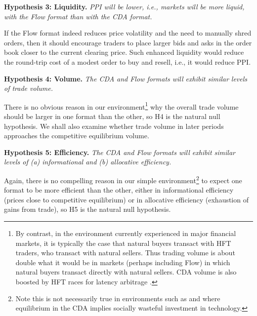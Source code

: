 \documentclass[12pt]{article}
\begin{document}
\vspace{0.3cm}
\noindent \textbf{Hypothesis 3: Liquidity.} \textit{ PPI will be lower, i.e., markets will be more liquid, with the Flow format than with the CDA format.}

\noindent 
If the Flow format indeed reduces price volatility and the need to manually shred orders, then it should encourage traders to place larger bids and asks in the order book closer to the current clearing price. Such enhanced liquidity would reduce the round-trip cost of a modest order to buy and resell, i.e., it would reduce PPI. 

\vspace{0.3cm}
\noindent \textbf{Hypothesis 4: Volume.} \textit{The CDA and Flow formats will exhibit similar levels of trade volume. }

\noindent There is no obvious reason in our environment\footnote{
{By contrast}, in the environment currently experienced in major financial markets, it is typically the case that natural buyers transact with HFT traders, who transact with natural sellers. Thus trading volume is about double what it would be in markets 
(perhaps including Flow) in which natural buyers transact directly with natural sellers.
CDA volume is also boosted by HFT races for latency arbitrage \citep{AquilinaBudishOneill2022}.}
why the overall trade volume should be larger in one format than the other, so H4 is the natural null hypothesis. We shall also examine whether trade volume in later periods approaches the competitive equilibrium volume. 

\vspace{0.3cm}
\noindent \textbf{Hypothesis 5: Efficiency.} \textit{The CDA and Flow formats will exhibit similar levels of (a) informational and (b) allocative efficiency.} 

\noindent Again, there is no compelling reason in our simple environment\footnote{
Note this is not necessarily true in environments such as \cite{Budish2015} and \cite{Aldrich2019} where equilibrium in the CDA implies socially wasteful investment in technology.}
to expect one format to be more efficient than the other, either in informational efficiency (prices close to competitive equilibrium) or in allocative efficiency (exhaustion of gains from trade), 
so H5 is the natural null hypothesis. 
\end{document}
